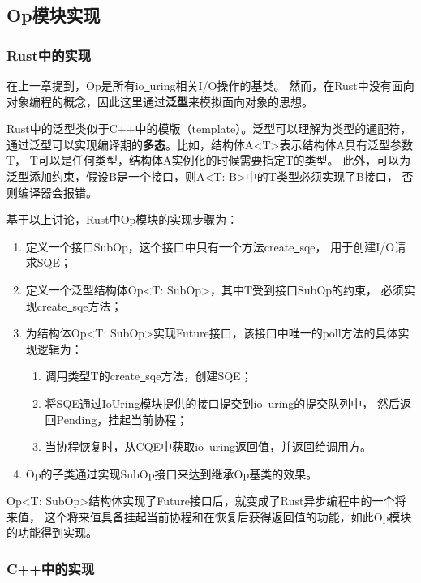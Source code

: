 \documentclass[supercite]{HustGraduPaper}
\theoremstyle{definition}
\begin{document}
\subsection{Op模块实现}
\subsubsection{Rust中的实现}
在上一章提到，Op是所有io\underline{~}uring相关I/O操作的基类。
然而，在Rust中没有面向对象编程的概念，因此这里通过\textbf{泛型}\cite{milanesi2022defining}来模拟面向对象的思想。\par

Rust中的泛型类似于C++中的模版（template）。泛型可以理解为类型的通配符，
通过泛型可以实现编译期的\textbf{多态}\cite{ford1945polymorphism}。比如，结构体A<T>表示结构体A具有泛型参数T，
T可以是任何类型，结构体A实例化的时候需要指定T的类型。
此外，可以为泛型添加约束，假设B是一个接口，则A<T: B>中的T类型必须实现了B接口，
否则编译器会报错。\par

基于以上讨论，Rust中Op模块的实现步骤为：

\begin{enumerate}[label={(\arabic*)}]
  \item 定义一个接口SubOp，这个接口中只有一个方法create\underline{~}sqe，
    用于创建I/O请求SQE；
  \item 定义一个泛型结构体Op<T: SubOp>，其中T受到接口SubOp的约束，
    必须实现create\underline{~}sqe方法；
  \item 为结构体Op<T: SubOp>实现Future接口，该接口中唯一的poll方法的具体实现逻辑为：
    \begin{enumerate}
      \item 调用类型T的create\underline{~}sqe方法，创建SQE；
      \item 将SQE通过IoUring模块提供的接口提交到io\underline{~}uring的提交队列中，
        然后返回Pending，挂起当前协程；
      \item 当协程恢复时，从CQE中获取io\underline{~}uring返回值，并返回给调用方。
    \end{enumerate}
  \item Op的子类通过实现SubOp接口来达到继承Op基类的效果。
\end{enumerate}

Op<T: SubOp>结构体实现了Future接口后，就变成了Rust异步编程中的一个将来值，
这个将来值具备挂起当前协程和在恢复后获得返回值的功能，如此Op模块的功能得到实现。\par

\subsubsection{C++中的实现}
\end{document}
